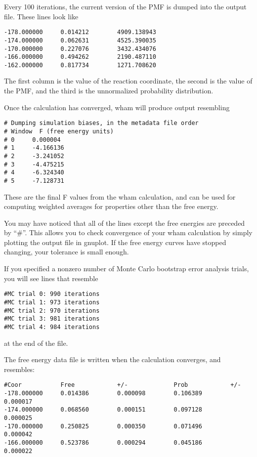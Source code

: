\documentclass[12pt]{article}
\begin{document}
Every 100 iterations, the current version of the PMF is dumped into the
output file.  These lines look like

\begin{verbatim}
-178.000000     0.014212        4909.138943
-174.000000     0.062631        4525.390035
-170.000000     0.227076        3432.434076
-166.000000     0.494262        2190.487110
-162.000000     0.817734        1271.708620
\end{verbatim}

The first column is the value of the reaction coordinate, the second is the
value of the PMF, and the third is the unnormalized probability
distribution.

Once the calculation has converged, wham will produce output resembling

\begin{verbatim}
# Dumping simulation biases, in the metadata file order 
# Window  F (free energy units)
# 0     0.000004
# 1     -4.166136
# 2     -3.241052
# 3     -4.475215
# 4     -6.324340
# 5     -7.128731
\end{verbatim}

These are the final F values from the wham calculation, and can be used for
computing weighted averages for properties other than the free energy.

You may have noticed that all of the lines except the free energies are
preceded by ``\#''.  This allows you to check convergence of your wham
calculation by simply plotting the output file in gnuplot.  If the free
energy curves have stopped changing, your tolerance is small enough.  

If you specified a nonzero number of Monte Carlo bootstrap error analysis
trials, you will see lines that resemble

\begin{verbatim}
#MC trial 0: 990 iterations
#MC trial 1: 973 iterations
#MC trial 2: 970 iterations
#MC trial 3: 981 iterations
#MC trial 4: 984 iterations
\end{verbatim}

at the end of the file.

The free energy data file is written when the calculation converges, and
resembles: 

\begin{verbatim}
#Coor           Free            +/-             Prob            +/-
-178.000000     0.014386        0.000098        0.106389        0.000017
-174.000000     0.068560        0.000151        0.097128        0.000025
-170.000000     0.250825        0.000350        0.071496        0.000042
-166.000000     0.523786        0.000294        0.045186        0.000022
\end{verbatim}
\end{document}
